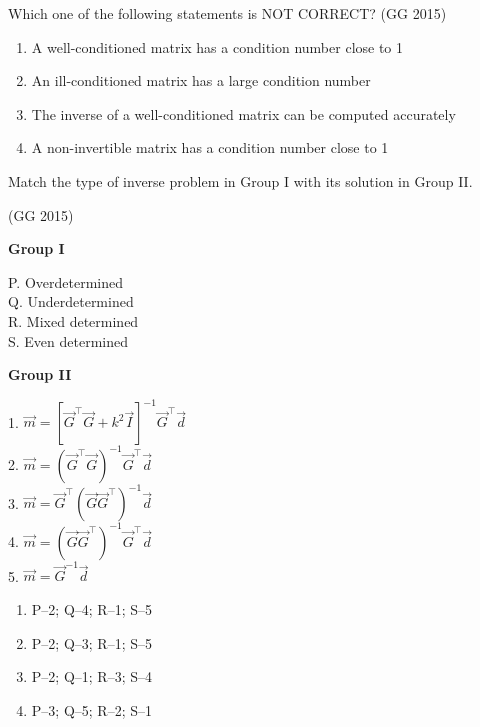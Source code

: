 \item Which one of the following statements is NOT CORRECT?
	\hfill (GG 2015)
\begin{enumerate}
\item A well-conditioned matrix has a condition number close to 1  
\item An ill-conditioned matrix has a large condition number  
\item The inverse of a well-conditioned matrix can be computed accurately  
\item A non-invertible matrix has a condition number close to 1  
\end{enumerate}
\item Match the type of inverse problem in Group I with its solution in Group II.

	\hfill (GG 2015)
\begin{multicols}{2}
\textbf{Group I}  
\begin{flushleft}
P. Overdetermined\\
Q. Underdetermined\\
R. Mixed determined\\
S. Even determined
\end{flushleft}
\columnbreak
\textbf{Group II}  
\begin{flushleft}
1. \( \vec{m} = [\vec{G}^{\top} \vec{G} + k^2 \vec{I}]^{-1} \vec{G}^{\top} \vec{d} \)\\
2. \( \vec{m} = (\vec{G}^{\top} \vec{G})^{-1} \vec{G}^{\top} \vec{d} \)\\
3. \( \vec{m} = \vec{G}^{\top} (\vec{G} \vec{G}^{\top})^{-1} \vec{d} \)\\
4. \( \vec{m} = (\vec{G} \vec{G}^{\top})^{-1} \vec{G}^{\top} \vec{d} \)\\
5. \( \vec{m} = \vec{G}^{-1} \vec{d} \)
\end{flushleft}
\end{multicols}
\begin{multicols}{2}
\begin{enumerate}
\item P--2; Q--4; R--1; S--5  
\item P--2; Q--3; R--1; S--5  
\item P--2; Q--1; R--3; S--4  
\item P--3; Q--5; R--2; S--1  
\end{enumerate}
\end{multicols}

